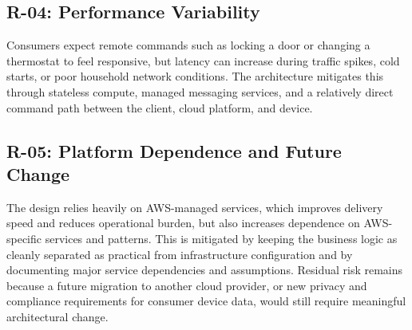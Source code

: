 \subsection{R-04: Performance Variability}

Consumers expect remote commands such as locking a door or changing a thermostat to feel responsive, but latency can increase during traffic spikes, cold starts, or poor household network conditions. The architecture mitigates this through stateless compute, managed messaging services, and a relatively direct command path between the client, cloud platform, and device.

\subsection{R-05: Platform Dependence and Future Change}

The design relies heavily on AWS-managed services, which improves delivery speed and reduces operational burden, but also increases dependence on AWS-specific services and patterns. This is mitigated by keeping the business logic as cleanly separated as practical from infrastructure configuration and by documenting major service dependencies and assumptions. Residual risk remains because a future migration to another cloud provider, or new privacy and compliance requirements for consumer device data, would still require meaningful architectural change.

